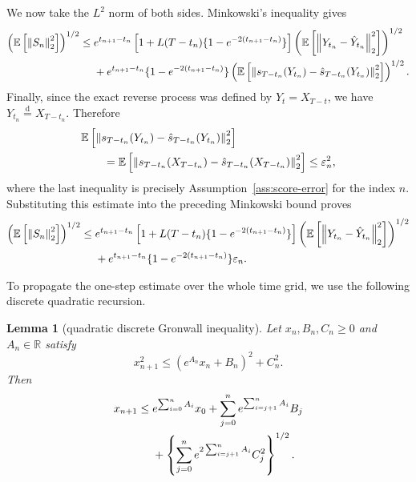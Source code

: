 \documentclass[11pt]{article}
\newtheorem{lemma}[theorem]{Lemma}
\theoremstyle{definition}
\newcommand{\R}{\mathbb{R}}
\newcommand{\E}{\mathbb{E}}
\newcommand{\norm}[1]{\left\lVert #1\right\rVert_2}
\begin{document}
We now take the $L^2$ norm of both sides. Minkowski's inequality
gives
\begin{align}
\left(\E\left[\norm{S_n}^2\right]\right)^{1/2}
\le{}&
e^{t_{n+1}-t_n}
\left[1+L(T-t_n)\{1-e^{-2(t_{n+1}-t_n)}\}\right]
\left(
    \E\left[
        \norm{Y_{t_n}-\hat Y_{t_n}}^2
    \right]
\right)^{1/2}\notag\\
&+e^{t_{n+1}-t_n}\{1-e^{-2(t_{n+1}-t_n)}\}
\left(
    \E\left[
        \norm{
            s_{T-t_n}(Y_{t_n})
            -\hat s_{T-t_n}(Y_{t_n})
        }^2
    \right]
\right)^{1/2}.\notag
\end{align}
Finally, since the exact reverse process was defined by
$Y_t=X_{T-t}$, we have
$Y_{t_n}\overset{\mathrm d}=X_{T-t_n}$. Therefore
\begin{align}
&\E\left[
    \norm{
        s_{T-t_n}(Y_{t_n})
        -\hat s_{T-t_n}(Y_{t_n})
    }^2
\right]\notag\\
&\qquad=
\E\left[
    \norm{
        s_{T-t_n}(X_{T-t_n})
        -\hat s_{T-t_n}(X_{T-t_n})
    }^2
\right]
\le\varepsilon_n^2,\notag
\end{align}
where the last inequality is precisely
Assumption~\ref{ass:score-error} for the index $n$. Substituting this
estimate into the preceding Minkowski bound proves
\begin{align}
    \left(\E\left[\norm{S_n}^2\right]\right)^{1/2}
    \le{}&e^{t_{n+1}-t_n}
    \left[1+L(T-t_n)\{1-e^{-2(t_{n+1}-t_n)}\}\right]
    \left(\E\left[\norm{Y_{t_n}-\hat Y_{t_n}}^2\right]\right)^{1/2}\notag\\
    &+e^{t_{n+1}-t_n}\{1-e^{-2(t_{n+1}-t_n)}\}\varepsilon_n.
\label{eq:Sn-bound}
\end{align}

To propagate the one-step estimate over the whole time grid, we use
the following discrete quadratic recursion.
\begin{lemma}[quadratic discrete Gronwall inequality]
\label{lem:discrete}
Let $x_n,B_n,C_n\ge0$ and $A_n\in\R$ satisfy
\begin{equation}
    x_{n+1}^2\le(e^{A_n}x_n+B_n)^2+C_n^2.
    \label{eq:discrete-hyp}
\end{equation}
Then
\begin{align}
    x_{n+1}\le{}&e^{\sum_{i=0}^nA_i}x_0
    +\sum_{j=0}^n e^{\sum_{i=j+1}^nA_i}B_j\notag\\
    &+\left\{\sum_{j=0}^n e^{2\sum_{i=j+1}^nA_i}C_j^2\right\}^{1/2}.
\label{eq:discrete-conclusion}
\end{align}
\end{lemma}
\end{document}
